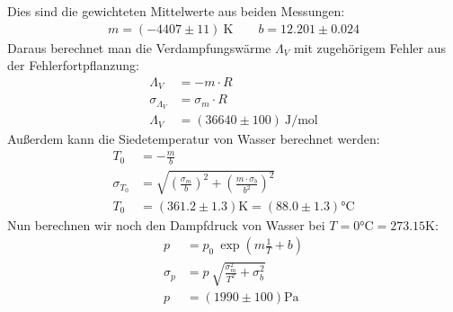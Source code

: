 \documentclass[12pt,a4paper,titlepage,headinclude,bibtotoc]{scrartcl}
\begin{document}
Dies sind die gewichteten Mittelwerte aus beiden Messungen:
\begin{align*}
 m=(-4407 \pm 11)~\si{\kelvin} \qquad
 b=12.201 \pm 0.024
\end{align*}
Daraus berechnet man die Verdampfungswärme $\Lambda_V$ mit zugehörigem Fehler aus der Fehlerfortpflanzung:
\begin{align*}
 \Lambda_V &= -m\cdot R\\
 \sigma_{\Lambda_V} &= \sigma_m \cdot R\\
 \Lambda_V&=(36640 \pm 100)~\si{\joule/\mol}
\end{align*}
Außerdem kann die Siedetemperatur von Wasser berechnet werden:
\begin{align*}
 T_0 &= -\frac{m}{b}\\
 \sigma_{T_0} &= \sqrt{\left(\frac{\sigma_m}{b}\right)^2+\left(\frac{m\cdot \sigma_b}{b^2}\right)^2}\\
 T_0 &= (361.2 \pm 1.3)\si{\kelvin} = (88.0 \pm 1.3)\si{\celsius}
\end{align*}
Nun berechnen wir noch den Dampfdruck von Wasser bei $T=0\si{\celsius}=273.15\si{\kelvin}$: 
\begin{align*}
 p &= p_0~\exp\left(m\frac{1}{T}+b\right)\\
 \sigma_p &= p~\sqrt{\frac{\sigma_m^2}{T^2}+\sigma_b^2}\\
 p &= (1990 \pm 100)\si{\pascal}
\end{align*}
\end{document}
